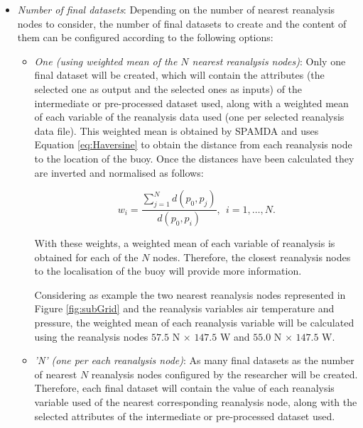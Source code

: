 \documentclass[energies,article,submit,moreauthors,pdftex]{Definitions/mdpi}
\begin{document}
\begin{itemize}[leftmargin=*,labelsep=5.8mm]
					\item \textit{Number of final datasets}: Depending on the number of nearest reanalysis nodes to consider, the number of final datasets to create and the content of them can be configured according to the following options:
						\begin{itemize}[leftmargin=*,labelsep=5.8mm]
						
							\item \textit{One (using weighted mean of the $N$ nearest reanalysis nodes)}: Only one final dataset will be created, which will contain the attributes (the selected one as output and the selected ones as inputs) of the intermediate or pre-processed dataset used, along with a weighted mean of each variable of the reanalysis data used (one per selected reanalysis data file). This weighted mean is obtained by SPAMDA and uses Equation \ref{eq:Haversine} to obtain the distance from each reanalysis node to the location of the buoy. Once the distances have been calculated they are inverted and normalised as follows:							
								\begin{linenomath*}
									\begin{equation}
										w_i=\frac{\sum_{j=1}^{N} d(p_0,p_j)}{d(p_0,p_i)}, ~~i=1, \ldots, N.
										\label{eq:weightedMean}
									\end{equation}
								\end{linenomath*}

							With these weights, a weighted mean of each variable of reanalysis is obtained for each of the $N$ nodes. Therefore, the closest reanalysis nodes to the localisation of the buoy will provide more information.
							
							Considering as example the two nearest reanalysis nodes represented in Figure \ref{fig:subGrid} and the reanalysis variables air temperature and pressure, the weighted mean of each reanalysis variable will be calculated using the reanalysis nodes $57.5$ N $\times$ $147.5$ W and $55.0$ N $\times$ $147.5$ W.
							
							\item \textit{'N' (one per each reanalysis node)}: As many final datasets as the number of nearest $N$ reanalysis nodes configured by the researcher will be created. Therefore, each final dataset will contain the value of each reanalysis variable used of the nearest corresponding reanalysis node, along with the selected attributes of the intermediate or pre-processed dataset used.
							

\end{itemize}
\end{itemize}
\end{document}
